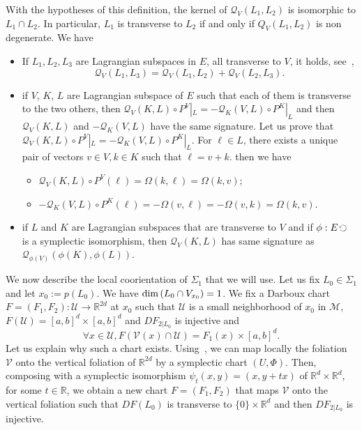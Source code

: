 \documentclass[AHL, Unicode, longabstracts, published]{cedram}
\newcommand*\M{\mathcal{M}}
\newcommand*\cq{\mathcal{Q}}
\newcommand*\cU{\mathcal{U}}
\newcommand*\cV{\mathcal{V}}
\newcommand*\cal{\mathcal}
\newcommand*\R{\mathbb{R}}
\renewcommand*\dim{{\rm dim}\,}
\let\oldforall\forall
\renewcommand*{\forall}{\mathrel{\oldforall}}
\begin{document}
With the hypotheses of this definition, the kernel of $ \cq_V(L_1,L_2)$ is isomorphic to $L_1\cap L_2$. In particular, $L_1$ is transverse to $L_2$ if and only if $Q_V(L_1,L_2)$ is non degenerate.\newline
We have
\begin{itemize}
\item If $L_1,L_2,L_3$ are Lagrangian subspaces in $E$, all transverse to $V$, it holds, see~\cite{Arn08},
\begin{equation}\label{prop:quadr:form}
\cq_V(L_1,L_3)=\cq_V(L_1,L_2)+\cq_V(L_2,L_3).
\end{equation}
\item if $V$, $K$, $L$ are Lagrangian subspace of $E$ such that each of them is transverse to the two others, then { $\cq_V(K,L)\circ P^V|_{L}=-\cq_K(V,L)\circ P^K|_{L}$ and then} $\cq_V(K,L)$ and $-\cq_K(V,L)$ have the same signature.\newline
Let us prove that $\cq_V(K,L)\circ P^V|_{L}=-\cq_K(V,L)\circ P^K|_{L}$. For $\ell\in L$, there exists a unique pair of vectors $v\in V, k\in K$ such that $\ell=v+k$. then we have
\begin{itemize}
\item $\cq_V(K,L)\circ P^V(\ell)=\Omega(k, \ell)=\Omega(k, v)$;
\item $-\cq_K(V,L)\circ P^K(\ell)=-\Omega(v, \ell)=-\Omega(v, k)=\Omega(k, v) $.
\end{itemize}

\item if $L$ and $K$ are Lagrangian subspaces that are transverse to $V$ and if $\phi:E\,\rotatebox[origin=c]{90}{$\circlearrowleft$}\,$ is a symplectic isomorphism, then $\cq_V(K, L)$ has same signature as $\cq_{\phi(V)}(\phi(K), \phi(L))$.
\end{itemize}
We now describe the local coorientation of $\Sigma_1$ that we will use. Let us fix $L_0\in\Sigma_1$ and let $x_0:=p(L_0)$. We have $\dim(L_0\cap V_{x_0})=1$. We fix a Darboux chart $F=(F_1, F_2): \cU\rightarrow\R^{2d}$ at $x_0$ such that $\cal U$ is a small neighborhood of $x_0$ in $\M$, $F(\cal U)=[a, b]^{d}\times [a, b]^d$ and $DF_{2|L_0}$ is injective and
\[
\forall x\in \cU, F({ \cV(x)}\cap \cal U)= F_1(x)\times [a, b]^d.
\]
Let us explain why such a chart exists. Using~\cite[Theorem~7.1]{Weinstein1971}, we can map locally the foliation $\cV$ onto the vertical foliation of $\R^{2d}$ by a symplectic chart $(U, \Phi)$. Then, composing with a symplectic isomorphism $\psi_t(x, y)=(x, y+tx)$ of $\R^d\times\R^d$, for some $t\in\R$, we obtain a new chart $F=(F_1, F_2)$ that maps $\cV$ onto the vertical foliation such that $DF(L_0)$ is transverse to $\{0\}\times \R^d$ and then $DF_{2|L_0}$ is injective.
\end{document}

